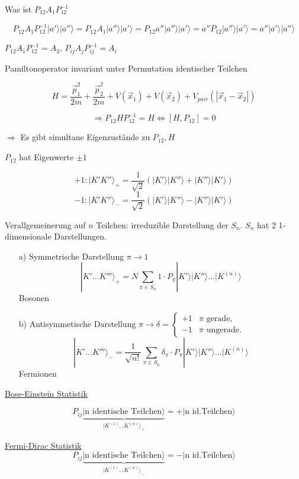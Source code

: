 Was ist \(P_{12}A_1P_{12}^{-1}\)

\[P_{12}A_1P_{12}^{-1}|a'\rangle |a''\rangle = P_{12}A_1 |a''\rangle |a'\rangle =  P_{12}a''|a''\rangle |a'\rangle = a'' P_{12}|a''\rangle |a'\rangle  = a''|a'\rangle |a''\rangle\]

\(P_{12}A_1 P_{12}^{-1} = A_2\), \(P_{ij}A_jP_{ij}^{-1}=A_i\)

Pamiltonoperator invariant unter Permutation identischer Teilchen

\[H= \frac{\vec p_1^2}{2m}+ \frac{\vec p_2^2}{2m} +V(\vec x_1)+ V(\vec x_2) + V_{pair}(|\vec x_1-\vec x_2|) \]

\[\Rightarrow P_{12}HP_{12}^{-1} = H \Leftrightarrow [H,P_{12}]=0\]


\(\Rightarrow \) Es gibt simultane Eigenzustände zu \(P_{12},H\)

\(P_{12}\) hat Eigenwerte \(\pm 1\)

\[+1: |K'K''\rangle_+=\frac{1}{\sqrt{2}}(|K'\rangle|K''\rangle + |K''\rangle|K'\rangle) \]
\[-1: |K'K''\rangle_-=\frac{1}{\sqrt{2}}(|K'\rangle|K''\rangle - |K''\rangle|K'\rangle) \]

Verallgemeinerung auf \(n\) Teilchen: irreduzible Darstellung  der \(S_n\). \(S_n\) hat 2 1-dimensionale Darstellungen. 

\begin{enumerate}
\item[a)] Symmetrische Darstellung \(\pi \to 1\)
\[|K'...K'''\rangle_+ = N\sum_{\pi\in S_n}1\cdot P_\pi |K'\rangle|K''\rangle...|K^{(n)}\rangle \]
Bosonen
\item[b)] Antisymmetische Darstellung \(\pi \to \delta=\begin{cases}
  +1 & \pi \text{ gerade,}\\
  -1 & \pi \text{ ungerade.}
\end{cases}\)
\[|K'...K'''\rangle_- = \frac{1}{\sqrt{n!}}\sum_{\pi\in S_n}\delta_\pi\cdot P_\pi |K'\rangle|K''\rangle...|K^{(n)}\rangle \]
Fermionen
\end{enumerate}




\underline{Bose-Einstein Statistik}

\[P_{ij}\underbrace{|\text{n identische Teilchen}\rangle}_{|K^{(1)}...K^{(n)}\rangle_+} = +|\text{n id.Teilchen}\rangle \]

\underline{Fermi-Dirac  Statistik}
\[P_{ij}\underbrace{|\text{n identische Teilchen}\rangle}_{|K^{(1)}...K^{(n)}\rangle_-} = -|\text{n id.Teilchen}\rangle \]

